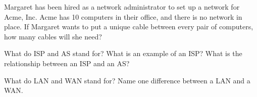 \begin{exercise}
    Margaret has been hired as a network administrator to set up a network for Acme, Inc. Acme has 10 computers in their office, and there is no network in place. If Margaret wants to put a unique cable between every pair of computers, how many cables will she need? 
\end{exercise}

\begin{exercise}
    What do ISP and AS stand for? What is an example of an ISP? What is the relationship between an ISP and an AS?
\end{exercise}

\begin{exercise}
    What do LAN and WAN stand for? Name one difference between a LAN and a WAN.
\end{exercise}